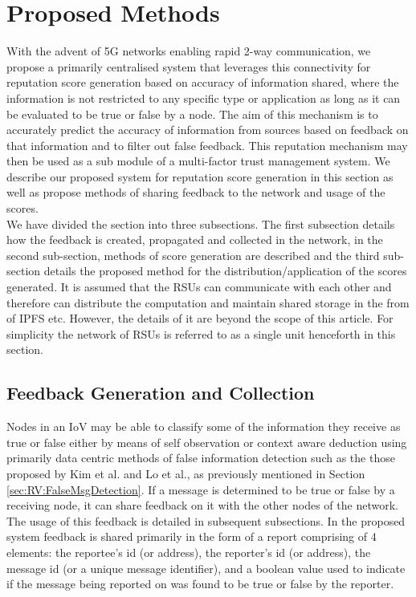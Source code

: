 \documentclass[journal]{IEEEtran}
\begin{document}
\section{Proposed Methods}
\label{sec:PM}
With the advent of 5G networks enabling rapid 2-way communication, we propose a primarily centralised system that leverages this connectivity for reputation score generation based on accuracy of information shared, where the information is not restricted to any specific type or application as long as it can be evaluated to be true or false by a node. The aim of this mechanism is to accurately predict the accuracy of information from sources based on feedback on that information and to filter out false feedback. This reputation mechanism may then be used as a sub module of a multi-factor trust management system.
We describe our proposed system for reputation score generation in this section as well as propose methods of sharing feedback to the network and usage of the scores. \\ We have divided the section into three subsections. The first subsection details how the feedback is created, propagated and collected in the network, in the second sub-section, methods of score generation are described and the third sub-section details the proposed method for the distribution/application of the scores generated. It is assumed that the RSUs can communicate with each other and therefore can distribute the computation and maintain shared storage in the from of IPFS etc.
However, the details of it are beyond the scope of this article. For simplicity the network of RSUs is referred to as a single unit henceforth in this section.
\subsection{Feedback Generation and Collection}
\label{sec:PM:FeedbackGen&Collect}
Nodes in an IoV may be able to classify some of the information they receive as true or false either by means of self observation or context aware deduction using primarily data centric methods of false information detection such as the those proposed by Kim et al.\cite{c:messagefilterCoE} and Lo et al.\cite{c:IllusionAttack}, as previously mentioned in Section \ref{sec:RV:FalseMsgDetection}. If a message is determined to be true or false by a receiving node, it can share feedback on it with the other nodes of the network. The usage of this feedback is detailed in subsequent subsections. In the proposed system feedback is shared primarily in the form of a report comprising of 4 elements: the reportee's id (or address), the reporter's id (or address), the message id (or a unique message identifier), and a boolean value used to indicate if the message being reported on was found to be true or false by the reporter. 
\end{document}

